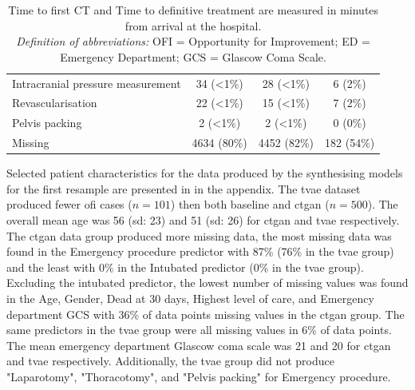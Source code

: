 \documentclass[12pt, a4paper]{article}
\begin{document}
\begin{table}[p]
{\begin{tabular}{lccc}
            \hspace{3mm}Intracranial pressure measurement & 34 (\textless1\%) & 28 (\textless1\%) & 6 (2\%)          \\
            \hspace{3mm}Revascularisation                 & 22 (\textless1\%) & 15 (\textless1\%) & 7 (2\%)          \\
            \hspace{3mm}Pelvis packing                    & 2 (\textless1\%)  & 2 (\textless1\%)  & 0 (0\%)          \\
            \hspace{3mm}Missing                           & 4634 (80\%)       & 4452 (82\%)       & 182 (54\%)       \\
            \bottomrule
        \end{tabular}
    }
    \caption*{\small Time to first CT and Time to definitive treatment are measured in minutes from arrival at the hospital.\\
        \textit{Definition of abbreviations:} OFI = Opportunity for Improvement; ED = Emergency Department; GCS = Glascow Coma Scale.}
\end{table}

Selected patient characteristics for the data produced by the synthesising models for the first resample are presented in  in the appendix. The \acrshort{tvae} dataset produced fewer \acrshort{ofi} cases ($n = 101$) then both baseline and \acrshort{ctgan} ($n = 500$). The overall mean age was 56 (\acrshort{sd}: 23) and 51 (\acrshort{sd}: 26) for \acrshort{ctgan} and \acrshort{tvae} respectively. The \acrshort{ctgan} data group produced more missing data, the most missing data was found in the Emergency procedure predictor with 87\% (76\% in the \acrshort{tvae} group) and the least with 0\% in the Intubated predictor (0\% in the \acrshort{tvae} group). Excluding the intubated predictor, the lowest number of missing values was found in the Age, Gender, Dead at 30 days, Highest level of care, and Emergency department GCS with 36\% of data points missing values in the \acrshort{ctgan} group. The same predictors in the \acrshort{tvae} group were all missing values in 6\% of data points. The mean emergency department Glascow coma scale was 21 and 20 for \acrshort{ctgan} and \acrshort{tvae} respectively. Additionally, the \acrshort{tvae} group did not produce "Laparotomy", "Thoracotomy", and "Pelvis packing" for Emergency procedure.
\end{document}
